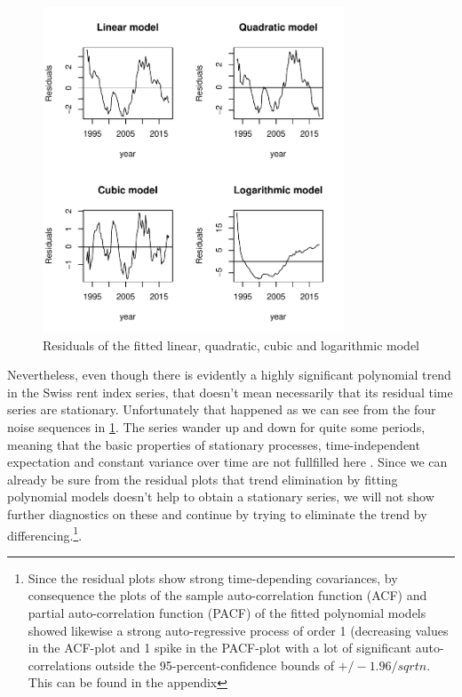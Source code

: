 \documentclass[11pt,a4paper]{article}
\begin{document}
\begin{figure} 
    \centering
    \includegraphics[width=0.8\textwidth]{resid_polynomials}
    \caption{Residuals of the fitted linear, quadratic, cubic and logarithmic model}
    \label{fig:resid_polynomials}
\end{figure}

Nevertheless, even though there is evidently a highly significant polynomial trend in the Swiss rent index series, that doesn't mean necessarily that its residual time series are stationary.
Unfortunately that happened as we can see from the four noise sequences in \cref{fig:resid_polynomials}.
The series wander up and down for quite some periods, meaning that the basic properties of stationary processes, time-independent expectation and constant variance over time are not fullfilled here \cite[p.~49]{bd02}.
Since we can already be sure from the residual plots that trend elimination by fitting polynomial models doesn't help to obtain a stationary series, we will not show further diagnostics on these and continue by trying to eliminate the trend by differencing.\footnote{Since the residual plots show strong time-depending covariances, by consequence the plots of the sample auto-correlation function (ACF) and partial auto-correlation function (PACF) of the fitted polynomial models showed likewise a strong auto-regressive process of order 1 (decreasing values in the ACF-plot and 1 spike in the PACF-plot with a lot of significant auto-correlations outside the 95-percent-confidence bounds of $+/-1.96/sqrt{n}$. This can be found in the appendix}. 
\end{document}
